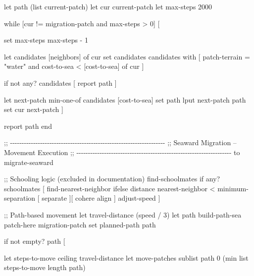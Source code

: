 \documentclass[
]{book}
\newenvironment{Shaded}{\begin{snugshade}}{\end{snugshade}}
\newcommand{\NormalTok}[1]{#1}
\begin{document}
\begin{Shaded}
\begin{Highlighting}[]
\NormalTok{  let path (list current{-}patch)}
\NormalTok{  let cur current{-}patch}
\NormalTok{  let max{-}steps 2000}

\NormalTok{  while [cur != migration{-}patch and max{-}steps \textgreater{} 0] [}

\NormalTok{    set max{-}steps max{-}steps {-} 1}

\NormalTok{    let candidates [neighbors] of cur}
\NormalTok{    set candidates candidates with [}
\NormalTok{      patch{-}terrain = "water" and }
\NormalTok{      cost{-}to{-}sea \textless{} [cost{-}to{-}sea] of cur}
\NormalTok{    ]}

\NormalTok{    if not any? candidates [}
\NormalTok{      report path}
\NormalTok{    ]}

\NormalTok{    let next{-}patch min{-}one{-}of candidates [cost{-}to{-}sea]}
\NormalTok{    set path lput next{-}patch path}
\NormalTok{    set cur next{-}patch}
\NormalTok{  ]}

\NormalTok{  report path}
\NormalTok{end}


\NormalTok{;; {-}{-}{-}{-}{-}{-}{-}{-}{-}{-}{-}{-}{-}{-}{-}{-}{-}{-}{-}{-}{-}{-}{-}{-}{-}{-}{-}{-}{-}{-}{-}{-}{-}{-}{-}{-}{-}{-}{-}{-}{-}{-}{-}{-}{-}{-}{-}{-}{-}{-}{-}{-}{-}{-}{-}{-}{-}{-}{-}{-}{-}{-}{-}{-}{-}{-}{-}}
\NormalTok{;;  Seaward Migration – Movement Execution}
\NormalTok{;; {-}{-}{-}{-}{-}{-}{-}{-}{-}{-}{-}{-}{-}{-}{-}{-}{-}{-}{-}{-}{-}{-}{-}{-}{-}{-}{-}{-}{-}{-}{-}{-}{-}{-}{-}{-}{-}{-}{-}{-}{-}{-}{-}{-}{-}{-}{-}{-}{-}{-}{-}{-}{-}{-}{-}{-}{-}{-}{-}{-}{-}{-}{-}{-}{-}{-}{-}}
\NormalTok{to migrate{-}seaward}
  
\NormalTok{  ;; Schooling logic (excluded in documentation)}
\NormalTok{  find{-}schoolmates}
\NormalTok{  if any? schoolmates [}
\NormalTok{    find{-}nearest{-}neighbor}
\NormalTok{    ifelse distance nearest{-}neighbor \textless{} minimum{-}separation [}
\NormalTok{      separate}
\NormalTok{    ][}
\NormalTok{      cohere}
\NormalTok{      align}
\NormalTok{    ]}
\NormalTok{    adjust{-}speed}
\NormalTok{  ]}

\NormalTok{  ;; Path{-}based movement}
\NormalTok{  let travel{-}distance (speed / 3)}
\NormalTok{  let path build{-}path{-}sea patch{-}here migration{-}patch}
\NormalTok{  set planned{-}path path}

\NormalTok{  if not empty? path [}

\NormalTok{    let steps{-}to{-}move ceiling travel{-}distance}
\NormalTok{    let move{-}patches sublist path 0 (min list steps{-}to{-}move length path)}


\end{Highlighting}
\end{Shaded}
\end{document}
